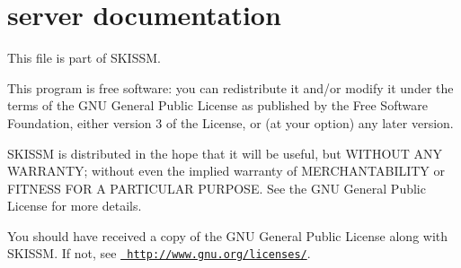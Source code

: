 \chapter{server documentation}
\hypertarget{test_server}{}\label{test_server}
This file is part of SKISSM.

This program is free software\+: you can redistribute it and/or modify it under the terms of the GNU General Public License as published by the Free Software Foundation, either version 3 of the License, or (at your option) any later version.

SKISSM is distributed in the hope that it will be useful, but WITHOUT ANY WARRANTY; without even the implied warranty of MERCHANTABILITY or FITNESS FOR A PARTICULAR PURPOSE. See the GNU General Public License for more details.

You should have received a copy of the GNU General Public License along with SKISSM. If not, see \href{http://www.gnu.org/licenses/}{\texttt{ http\+://www.\+gnu.\+org/licenses/}}. 